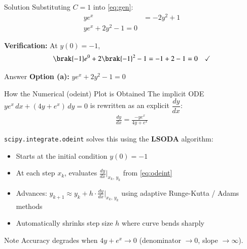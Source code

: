 \documentclass{beamer}
\begin{document}
\begin{frame}{Solution}
Substituting $C = 1$ into \eqref{eq:gen}:
\begin{align}
    ye^x &= -2y^2 + 1 \\
    \boxed{ye^x + 2y^2 - 1 = 0}
\end{align}

\textbf{Verification:} At $y(0)=-1$,
\begin{align}
    \brak{-1}e^{0} + 2\brak{-1}^2 - 1 = -1 + 2 - 1 = 0 \quad \checkmark
\end{align}

\begin{block}{Answer}
\centering \textbf{Option (a):} $ye^x + 2y^2 - 1 = 0$
\end{block}
\end{frame}

\begin{frame}{How the Numerical (odeint) Plot is Obtained}
The implicit ODE $ye^x\,dx + (4y+e^x)\,dy = 0$ is rewritten as an explicit $\dfrac{dy}{dx}$:
\begin{align}
    \frac{dy}{dx} = \frac{-ye^x}{4y + e^x} \label{eq:odeint}
\end{align}

\texttt{scipy.integrate.odeint} solves this using the \textbf{LSODA} algorithm:
\begin{itemize}
    \item Starts at the initial condition $y(0) = -1$
    \item At each step $x_k$, evaluates $\frac{dy}{dx}\big|_{x_k,\,y_k}$ from \eqref{eq:odeint}
    \item Advances: $y_{k+1} \approx y_k + h\cdot\frac{dy}{dx}\big|_{x_k,\,y_k}$ using adaptive Runge-Kutta / Adams methods
    \item Automatically shrinks step size $h$ where curve bends sharply
\end{itemize}

\begin{block}{Note}
    Accuracy degrades when $4y + e^x \to 0$ (denominator $\to 0$, slope $\to \infty$).
\end{block}
\end{frame}
\end{document}
